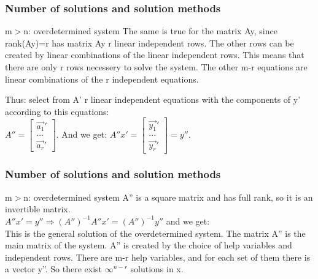 \begin{frame}
	\frametitle{Number of solutions and solution methods}
	\begin{block}{m$>$n: overdetermined system}
		The same is true for the matrix Ay, since rank(Ay)=r has matrix Ay r linear independent rows. The other rows can be created by linear combinations of the linear independent rows. This means that there are only r rows necessery to solve the system. The other m-r equations are linear combinations of the r independent equations.\vspace{4mm}
		
		Thus: select from A' r linear independent equations with the components of y' according to this equations: \\
		$A''=\begin{bmatrix}
		\overrightarrow{a_1}'\\...\\ \overrightarrow{a_r}'
		\end{bmatrix}$. And we get: $A''x'=\begin{bmatrix}
		\overrightarrow{y_1}'\\...\\ \overrightarrow{y_r}'
		\end{bmatrix}=y''$.
	\end{block}
\end{frame}

\begin{frame}
	\frametitle{Number of solutions and solution methods}
	\begin{block}{m$>$n: overdetermined system}
		A'' is a square matrix and has full rank, so it is an invertible matrix.\\
		$A''x'=y'' \Rightarrow (A'')^{-1}A''x'=(A'')^{-1}y''$ and we get:\\
		 \vspace{2mm}
		This is the general solution of the overdetermined system. The matrix A'' is the main matrix of the system. A'' is created by the choice of help variables and independent rows. There are m-r help variables, and for each set of them there is a vector y''. So there exist $\infty^{n-r}$ solutions in x. 
	\end{block}
\end{frame}


